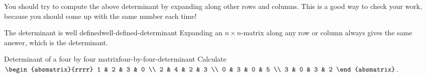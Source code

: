 You should try to compute the above determinant by expanding along
other rows and columns. This is a good way to check your work, because
you should come up with the same number each time!

\begin{theorem}{The determinant is well defined}{well-defined-determinant}
  Expanding an $n\times n$-matrix along any row or column always gives
  the same answer, which is the determinant.
\end{theorem}

\begin{example}{Determinant of a four by four matrix}{four-by-four-determinant}
  Calculate
  $\begin{absmatrix}{rrrr}
    1 & 2 & 3 & 0 \\
    2 & 4 & 2 & 3 \\
    0 & 3 & 0 & 5 \\
    3 & 0 & 3 & 2
  \end{absmatrix}$.
\end{example}

